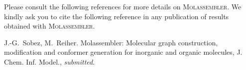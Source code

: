 \documentclass[]{tufte-book}
\begin{document}
Please consult the following references for more details on
\textsc{Molassembler}. We kindly ask you to cite the following reference in any
publication of results obtained with \textsc{Molassembler}.

\vspace{1cm}


J.-G.~Sobez, M.~Reiher. Molassembler: Molecular graph construction, modification
and conformer generation for inorganic and organic molecules, J. Chem. Inf.
Model., \textit{submitted}.




\backmatter




\end{document}
